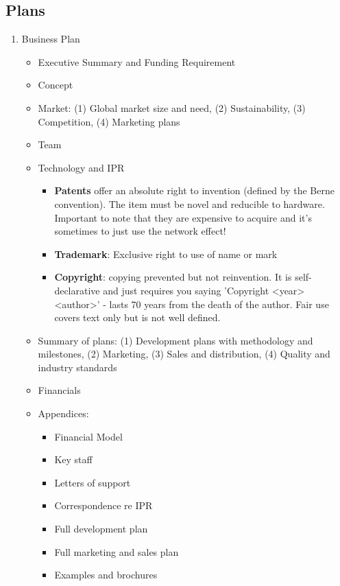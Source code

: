 \documentclass{article}
\begin{document}
\begin{multicols}{2}
\subsection{Plans}
\begin{enumerate}
    \item Business Plan
        \begin{itemize}
            \item Executive Summary and Funding Requirement
            \item Concept
            \item Market: (1) Global market size and need, (2) Sustainability, (3) Competition, (4) Marketing plans
            \item Team
            \item Technology and IPR
            \begin{itemize}
                \item \textbf{Patents} offer an absolute right to invention (defined by the Berne convention). The item must be novel and reducible to hardware. Important to note that they are expensive to acquire and it's sometimes to just use the network effect!
                \item \textbf{Trademark}: Exclusive right to use of name or mark
                \item \textbf{Copyright}: copying prevented but not reinvention. It is self-declarative and just requires you saying 'Copyright <year> <author>' - lasts 70 years from the death of the author. Fair use covers text only but is not well defined. 
            \end{itemize}
            \item Summary of plans: (1) Development plans with methodology and milestones, (2) Marketing, (3) Sales and distribution, (4) Quality and industry standards
            \item Financials
            \item Appendices:
            \begin{itemize}
                \item Financial Model
                \item Key staff
                \item Letters of support
                \item Correspondence re IPR
                \item Full development plan
                \item Full marketing and sales plan
                \item Examples and brochures

\end{itemize}
\end{itemize}
\end{enumerate}
\end{multicols}
\end{document}
